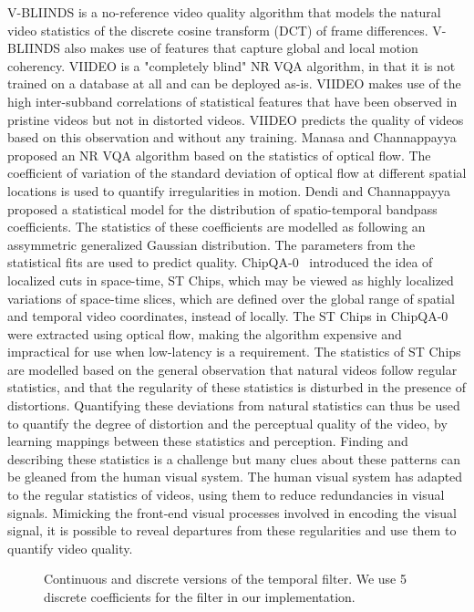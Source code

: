 \documentclass[journal]{IEEEtran}
\begin{document}
V-BLIINDS \cite{vbliinds} is a no-reference video quality algorithm that models the natural video statistics of the discrete cosine transform (DCT) of frame differences. V-BLIINDS also makes use of features that capture global and local motion coherency. VIIDEO \cite{viideo} is a "completely blind" NR VQA algorithm, in that it is not trained on a database at all and can be deployed as-is. VIIDEO makes use of the high inter-subband correlations of statistical features that have been observed in pristine videos but not in distorted videos. VIIDEO predicts the quality of videos based on this observation and without any training. Manasa and Channappayya \cite{nrof} proposed an NR VQA algorithm based on the statistics of optical flow. The coefficient of variation of the standard deviation of optical flow at different spatial locations is used to quantify irregularities in motion. Dendi and Channappayya \cite{3dmscn} proposed a statistical model for the distribution of spatio-temporal bandpass coefficients. The statistics of these coefficients are modelled as following an assymmetric generalized Gaussian distribution. The parameters from the statistical fits are used to predict quality. ChipQA-0~\cite{chipqa0} introduced the idea of localized cuts in space-time, ST Chips, which may be viewed as highly localized variations of space-time slices, which are defined over the global range of spatial and temporal video coordinates, instead of locally. The ST Chips in ChipQA-0 were extracted using optical flow, making the algorithm expensive and impractical for use when low-latency is a requirement. The statistics of ST Chips are modelled based on the general observation that natural videos follow regular statistics, and that the regularity of these statistics is disturbed in the presence of distortions. Quantifying these deviations from natural statistics can thus be used to quantify the degree of distortion and the perceptual quality of the video, by learning mappings between these statistics and perception. Finding and describing these statistics is a challenge but many clues about these patterns can be gleaned from the human visual system. The human visual system has adapted to the regular statistics of videos, using them to reduce redundancies in visual signals. Mimicking the front-end visual processes involved in encoding the visual signal, it is possible to reveal departures from these regularities and use them to quantify video quality.

\begin{figure*}
\centering
{}
\caption{Continuous and discrete versions of the temporal filter. We use 5 discrete coefficients for the filter in our implementation.}
\label{fig:kt}
\end{figure*}
\end{document}
